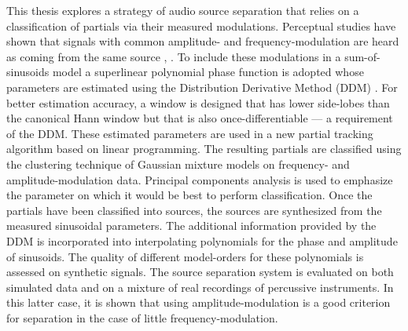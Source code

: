 This thesis explores a strategy of audio source separation that relies on a
classification of partials via their measured modulations. Perceptual studies
have shown that signals with common amplitude\hyp{} and
frequency\hyp{}modulation are heard as coming from the same source
\cite{mcadams1989segregation}, \cite{marin1991segregation}. To include these
modulations in a sum-of-sinusoids model a superlinear polynomial phase function
is adopted whose parameters are estimated using the Distribution Derivative
Method (DDM) \cite{betser2009sinusoidal}. For better estimation accuracy, a
window is designed that has lower side-lobes than the canonical Hann window but
that is also once-differentiable --- a requirement of the DDM. These estimated
parameters are used in a new partial tracking algorithm based on linear
programming. The resulting partials are classified using the clustering
technique of Gaussian mixture models \cite{friedman2001elements} on frequency-
and amplitude-modulation data. Principal components analysis is used to
emphasize the parameter on which it would be best to perform classification.
Once the partials have been classified into sources, the sources are synthesized
from the measured sinusoidal parameters.  The additional information provided by
the DDM is incorporated into interpolating polynomials for the phase and
amplitude of sinusoids. The quality of different model-orders for these
polynomials is assessed on synthetic signals. The source separation system is
evaluated on both simulated data and on a mixture of real recordings of
percussive instruments. In this latter case, it is shown that using
amplitude-modulation is a good criterion for separation in the case of little
frequency-modulation.
